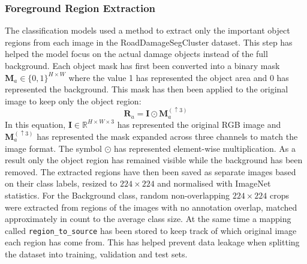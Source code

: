 \documentclass{article}
\begin{document}
\subsubsection*{Foreground Region Extraction}\label{sec:region_extract}
The classification models used a method to extract only the important object regions from each image in the RoadDamageSegCluster dataset. This step has helped the model focus on the actual damage objects instead of the full background. Each object mask has first been converted into a binary mask $\mathbf{M}_a \in \{0,1\}^{H \times W}$ where the value 1 has represented the object area and 0 has represented the background. This mask has then been applied to the original image to keep only the object region:
\[
  \mathbf{R}_a = \mathbf{I} \odot \mathbf{M}_a^{(\uparrow 3)}
\]
In this equation, $\mathbf{I} \in \mathbb{R}^{H \times W \times 3}$ has represented the original RGB image and $\mathbf{M}_a^{(\uparrow 3)}$ has represented the mask expanded across three channels to match the image format. The symbol $\odot$ has represented element-wise multiplication. As a result only the object region has remained visible while the background has been removed. The extracted regions have then been saved as separate images based on their class labels, resized to $224\times224$ and normalised with ImageNet statistics. For the Background class, random non-overlapping $224\times224$ crops were extracted from regions of the images with no annotation overlap, matched approximately in count to the average class size. At the same time a mapping called \texttt{region\_to\_source} has been stored to keep track of which original image each region has come from. This has helped prevent data leakage when splitting the dataset into training, validation and test sets.
\end{document}
